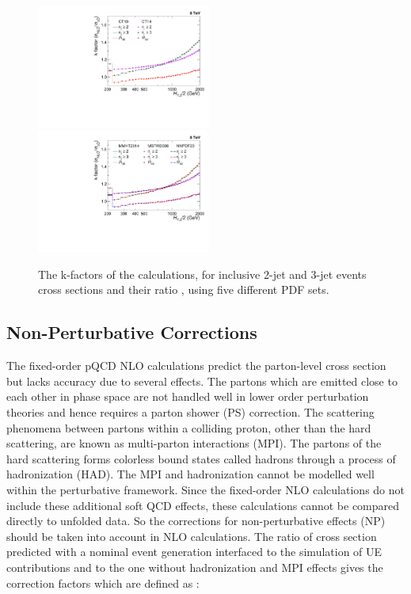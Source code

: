 \begin{figure}[!htbp]
 \begin{center}
 \hspace*{-5mm}\includegraphics[width=0.51\textwidth]{Plots_HT_2_150/Kfactor_all_1.pdf}%
 ~~\includegraphics[width=0.51\textwidth]{Plots_HT_2_150/Kfactor_all_2.pdf}
 \caption{The k-factors of the \NLOJETPP calculations, for inclusive 2-jet and 3-jet events cross sections and their ratio \ratio, using five different PDF sets.}
 \label{fig:kfactor}
 \end{center}
\end{figure}

\subsection{Non-Perturbative Corrections}
\label{sec:NPcorr}

The fixed-order pQCD NLO calculations predict the parton-level cross section but lacks accuracy due to several effects. The partons which are emitted close to each other in phase space are not handled well in lower order perturbation theories and hence requires a parton shower (PS) correction. The scattering phenomena between partons within a colliding proton, other than the hard scattering, are known as multi-parton interactions (MPI). The partons of the hard scattering forms colorless bound states called hadrons through a process of hadronization (HAD). The MPI and hadronization cannot be modelled well within the perturbative framework. Since the fixed-order NLO calculations do not include these additional soft QCD effects, these calculations cannot be compared directly to unfolded data. So the corrections for non-perturbative effects (NP) should be taken into account in NLO calculations. The ratio of cross section predicted with a nominal event generation interfaced to the simulation of UE contributions and to the one without hadronization and MPI effects gives the correction factors which are defined as : 


